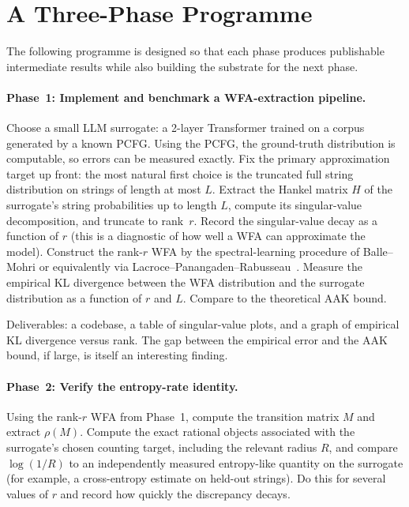 \section{A Three-Phase Programme}
\label{ch19:threephase}

The following programme is designed so that each phase produces
publishable intermediate results while also building the substrate for
the next phase.

\paragraph{Phase~1: Implement and benchmark a WFA-extraction pipeline.}
\label{ch19:phase1}

Choose a small LLM surrogate: a 2-layer Transformer trained on a corpus
generated by a known PCFG.  Using the PCFG, the ground-truth
distribution is computable, so errors can be measured exactly.  Fix the
primary approximation target up front: the most natural first choice is
the truncated full string distribution on strings of length at most $L$.
Extract
the Hankel matrix $H$ of the surrogate's string probabilities up to
length $L$, compute its singular-value decomposition, and truncate to
rank~$r$.  Record the singular-value decay as a function of $r$ (this
is a diagnostic of how well a WFA can approximate the model).  Construct
the rank-$r$ WFA by the spectral-learning procedure of
Balle--Mohri or equivalently via Lacroce--Panangaden--Rabusseau~\cite{LacrocePanangadenRabusseau2021}.
Measure the empirical KL divergence between the WFA distribution and the
surrogate distribution as a function of $r$ and $L$.  Compare to the
theoretical AAK bound.

Deliverables: a codebase, a table of singular-value plots, and a
graph of empirical KL divergence versus rank.  The gap between the
empirical error and the AAK bound, if large, is itself an interesting
finding.

\paragraph{Phase~2: Verify the entropy-rate identity.}
\label{ch19:phase2}

Using the rank-$r$ WFA from Phase~1, compute the transition matrix $M$
and extract $\rho(M)$.  Compute the exact rational objects associated
with the surrogate's chosen counting target, including the relevant
radius $R$, and compare $\log(1/R)$ to an independently measured
entropy-like quantity on the surrogate (for example, a cross-entropy
estimate on held-out strings).  Do this
for several values of $r$ and record how quickly the discrepancy
decays.

